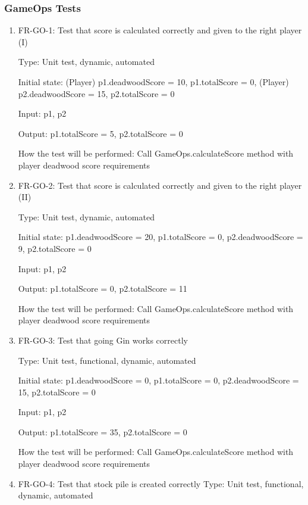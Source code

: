 \documentclass[12pt, titlepage]{article}
\begin{document}
\subsubsection{GameOps Tests}
\begin{enumerate}
    \item{FR-GO-1: Test that score is calculated correctly and given to the right player (I)}
    
    Type: Unit test, dynamic, automated
    
    Initial state: (Player) p1.deadwoodScore = 10, p1.totalScore = 0, (Player) p2.deadwoodScore = 15, p2.totalScore = 0
    
    Input: p1, p2
    
    Output: p1.totalScore = 5, p2.totalScore = 0
    
    How the test will be performed: Call GameOps.calculateScore method with player deadwood score requirements
    
    \item{FR-GO-2: Test that score is calculated correctly and given to the right player (II)}
    
    Type: Unit test, dynamic, automated
    
    Initial state: p1.deadwoodScore = 20, p1.totalScore = 0, p2.deadwoodScore = 9, p2.totalScore = 0
    
    Input: p1, p2
    
    Output: p1.totalScore = 0, p2.totalScore = 11
    
    How the test will be performed: Call GameOps.calculateScore method with player deadwood score requirements
    
    \item{FR-GO-3: Test that going Gin works correctly}
    
    Type: Unit test, functional, dynamic, automated
    
    Initial state: p1.deadwoodScore = 0, p1.totalScore = 0, p2.deadwoodScore = 15, p2.totalScore = 0
    
    Input: p1, p2
    
    Output: p1.totalScore = 35, p2.totalScore = 0
    
    How the test will be performed: Call GameOps.calculateScore method with player deadwood score requirements
    
    \item{FR-GO-4: Test that stock pile is created correctly}
    Type: Unit test, functional, dynamic, automated
    

\end{enumerate}
\end{document}
